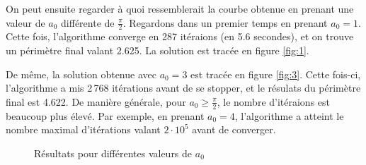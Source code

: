 \documentclass[10pt,a4paper]{article}
\theoremstyle{plain}
\theoremstyle{definition}
\begin{document}
On peut ensuite regarder à quoi ressemblerait la courbe obtenue en prenant une valeur de $a_0$ différente de $\frac{\pi}{2}$. Regardons dans un premier temps en prenant $a_0=1$. Cette fois, l'algorithme converge en 287 itéraions (en 5.6 secondes), et on trouve un périmètre final valant 2.625. La solution est tracée en figure \ref{fig:1}.

De même, la solution obtenue avec $a_0=3$ est tracée en figure \ref{fig:3}. Cette fois-ci, l'algorithme a mis 2\,768 itérations avant de se stopper, et le résulats du périmètre final est 4.622. De manière générale, pour $a_0\geqslant\frac{\pi}{2}$, le nombre d'itéraions est beaucoup plus élevé. Par exemple, en prenant $a_0=4$, l'algorithme a atteint le nombre maximal d'itérations valant $2\cdot10^{5}$ avant de converger.



\begin{figure}
	\centering
	\caption{Résultats pour différentes valeurs de $a_0$}
	\label{fig:diff}
\end{figure}
\end{document}
